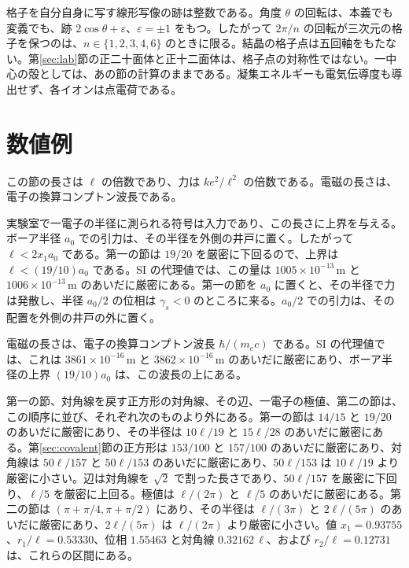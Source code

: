 \documentclass[a4paper]{article}
\begin{document}
格子を自分自身に写す線形写像の跡は整数である。角度 \(\theta\) の回転は、本義でも変義でも、跡 \(2\cos\theta+\varepsilon\)、\(\varepsilon=\pm 1\) をもつ。したがって \(2\pi/n\) の回転が三次元の格子を保つのは、\(n\in\{1,2,3,4,6\}\) のときに限る。結晶の格子点は五回軸をもたない。第\ref{sec:lab}節の正二十面体と正十二面体は、格子点の対称性ではない。一中心の殻としては、あの節の計算のままである。凝集エネルギーも電気伝導度も導出せず、各イオンは点電荷である。

\section{数値例}
\label{sec:numbers}

この節の長さは \(\ell\) の倍数であり、力は \(k e^{2}/\ell^{2}\) の倍数である。電磁の長さは、電子の換算コンプトン波長である。

実験室で一電子の半径に測られる符号は入力であり、この長さに上界を与える。ボーア半径 \(a_0\) での引力は、その半径を外側の井戸に置く。したがって \(\ell<2x_1 a_0\) である。第一の節は \(19/20\) を厳密に下回るので、上界は \(\ell<(19/10)a_0\) である。SI の代理値では、この量は \(1005\times 10^{-13}\,\mathrm{m}\) と \(1006\times 10^{-13}\,\mathrm{m}\) のあいだに厳密にある。第一の節を \(a_0\) に置くと、その半径で力は発散し、半径 \(a_0/2\) の位相は \(\gamma_s<0\) のところに来る。\(a_0/2\) での引力は、その配置を外側の井戸の外に置く。

電磁の長さは、電子の換算コンプトン波長 \(\hbar/(m_e c)\) である。SI の代理値では、これは \(3861\times 10^{-16}\,\mathrm{m}\) と \(3862\times 10^{-16}\,\mathrm{m}\) のあいだに厳密にあり、ボーア半径の上界 \((19/10)a_0\) は、この波長の上にある。

第一の節、対角線を戻す正方形の対角線、その辺、一電子の極値、第二の節は、この順序に並び、それぞれ次のものより外にある。第一の節は \(14/15\) と \(19/20\) のあいだに厳密にあり、その半径は \(10\ell/19\) と \(15\ell/28\) のあいだに厳密にある。第\ref{sec:covalent}節の正方形は \(153/100\) と \(157/100\) のあいだに厳密にあり、対角線は \(50\ell/157\) と \(50\ell/153\) のあいだに厳密にあり、\(50\ell/153\) は \(10\ell/19\) より厳密に小さい。辺は対角線を \(\sqrt{2}\) で割った長さであり、\(50\ell/157\) を厳密に下回り、\(\ell/5\) を厳密に上回る。極値は \(\ell/(2\pi)\) と \(\ell/5\) のあいだに厳密にある。第二の節は \((\pi+\pi/4,\pi+\pi/2)\) にあり、その半径は \(\ell/(3\pi)\) と \(2\ell/(5\pi)\) のあいだに厳密にあり、\(2\ell/(5\pi)\) は \(\ell/(2\pi)\) より厳密に小さい。値 \(x_1=0.93755\)、\(r_1/\ell=0.53330\)、位相 \(1.55463\) と対角線 \(0.32162\,\ell\)、および \(r_2/\ell=0.12731\) は、これらの区間にある。
\end{document}
